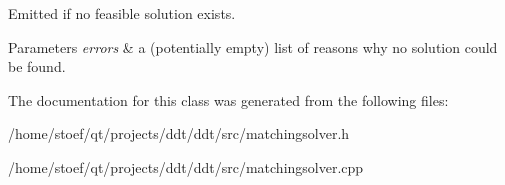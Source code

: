 Emitted if no feasible solution exists. 


\begin{DoxyParams}{Parameters}
{\em errors} & a (potentially empty) list of reasons why no solution could be found. \\
\hline
\end{DoxyParams}


The documentation for this class was generated from the following files\-:\begin{DoxyCompactItemize}
\item 
/home/stoef/qt/projects/ddt/ddt/src/matchingsolver.\-h\item 
/home/stoef/qt/projects/ddt/ddt/src/matchingsolver.\-cpp\end{DoxyCompactItemize}
